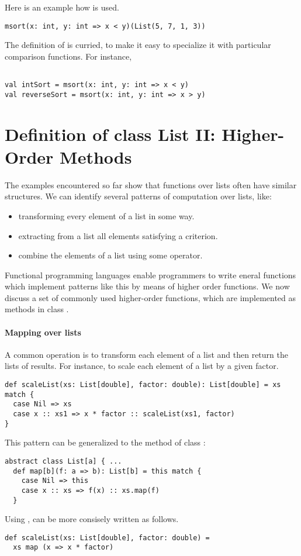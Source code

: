 Here is an example how  is used.
\begin{lstlisting}
msort(x: int, y: int => x < y)(List(5, 7, 1, 3))
\end{lstlisting}
The definition of  is curried, to make it easy to specialize it with particular
comparison functions. For instance,
\begin{lstlisting}

val intSort = msort(x: int, y: int => x < y)
val reverseSort = msort(x: int, y: int => x > y)
\end{lstlisting}

\section{Definition of class List II: Higher-Order Methods}

The examples encountered so far show that functions over lists often
have similar structures. We can identify several patterns of
computation over lists, like:
\begin{itemize}
      \item transforming every element of a list in some way.
      \item extracting from a list all elements satisfying a criterion.
      \item combine the elements of a list using some operator.
\end{itemize}
Functional programming languages enable programmers to write eneral
functions which implement patterns like this by means of higher order
functions. We now discuss a set of commonly used higher-order
functions, which are implemented as methods in class .

\paragraph{Mapping over lists}
A common operation is to transform each element of a list and then
return the lists of results.  For instance, to scale each element of a
list by a given factor.
\begin{lstlisting}
def scaleList(xs: List[double], factor: double): List[double] = xs match {
  case Nil => xs
  case x :: xs1 => x * factor :: scaleList(xs1, factor)
}
\end{lstlisting}
This pattern can be generalized to the  method of class :
\begin{lstlisting}
abstract class List[a] { ...
  def map[b](f: a => b): List[b] = this match {
    case Nil => this
    case x :: xs => f(x) :: xs.map(f)
  }
\end{lstlisting}
Using ,  can be more consisely written as follows.
\begin{lstlisting}
def scaleList(xs: List[double], factor: double) = 
  xs map (x => x * factor)
\end{lstlisting}

